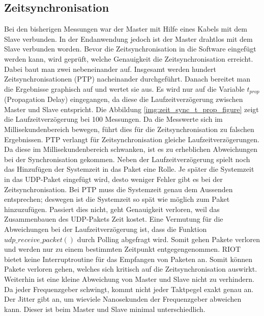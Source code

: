 \subsection{Zeitsynchronisation}
Bei den bisherigen Messungen war der Master mit Hilfe eines Kabels mit dem Slave verbunden. In der Endanwendung jedoch ist der Master drahtlos mit dem Slave verbunden worden. Bevor die Zeitsynchronisation in die Software eingefügt werden kann, wird geprüft, welche Genauigkeit die Zeitsynchronisation erreicht. Dabei baut man zwei \board \platz nebeneinander auf. Insgesamt werden hundert Zeitsynchronisationen (PTP) nacheinander durchgeführt. Danach bereitet man die Ergebnisse graphisch auf und wertet sie aus. Es wird nur auf die Variable $t_{prop}$ (Propagation Delay) eingegangen, da diese die Laufzeitverzögerung zwischen Master und Slave entspricht. Die Abbildung \ref{img:zeit_sync_t_prop_figure} zeigt die Laufzeitverzögerung bei \si{100} Messungen. Da die Messwerte sich im Millisekundenbereich bewegen, führt dies für die Zeitsynchronisation zu falschen Ergebnissen. PTP verlangt für Zeitsynchronisation gleiche Laufzeitverzögerungen. Da diese im Millisekundenbereich schwanken, ist es zu erheblichen Abweichungen bei der Synchronisation gekommen. Neben der Laufzeitverzögerung spielt noch das Hinzufügen der Systemzeit in das Paket eine Rolle. Je später die Systemzeit in das UDP-Paket eingefügt wird, desto weniger Fehler gibt es bei der Zeitsynchronisation. Bei PTP muss die Systemzeit genau dem Aussenden entsprechen; deswegen ist die Systemzeit so spät wie möglich zum Paket hinzuzufügen. Passiert dies nicht, geht Genauigkeit verloren, weil das Zusammenbauen des UDP-Pakets Zeit kostet. Eine Vermutung für die Abweichungen bei der Laufzeitverzögerung ist, dass die Funktion $udp\_receive\_packet()$ durch Polling abgefragt wird. Somit gehen Pakete verloren und werden nur zu einem bestimmten Zeitpunkt entgegengenommen. RIOT bietet keine Interruptroutine für das Empfangen von Paketen an. Somit können Pakete verloren gehen, welches sich kritisch auf die Zeitsynchronisation auswirkt. Weiterhin ist eine kleine Abweichung von Master und Slave nicht zu verhindern. Da jeder Frequenzgeber schwingt, kommt nicht jeder Taktpegel exakt genau an. Der Jitter gibt an, um wieviele Nanosekunden der Frequenzgeber abweichen kann. Dieser ist beim Master und Slave minimal unterschiedlich. 

